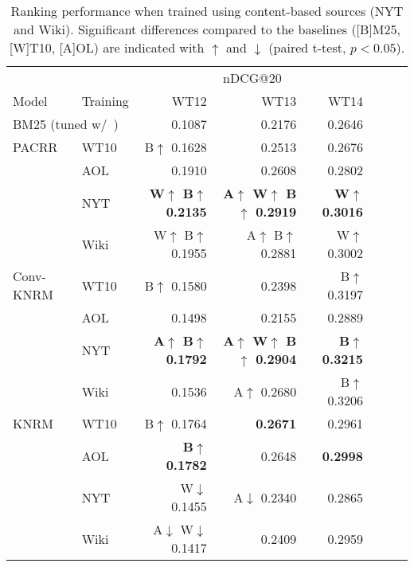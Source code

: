 \begin{table}
\scriptsize
\caption{Ranking performance when trained using content-based sources (NYT and Wiki). Significant differences compared to the baselines ([B]M25, [W]T10, [A]OL) are indicated with $\uparrow$ and $\downarrow$ (paired t-test, $p<0.05$).}\label{tab.results}
\vspace{-1em}
\begin{tabular}{llrrrrrr}
\toprule
&&\multicolumn{3}{c}{nDCG@20} \\\cmidrule(lr){3-5}
        Model &   Training & WT12 & WT13 & WT14 \\
\midrule


\multicolumn{2}{l}{BM25 (tuned w/~\cite{Yang2017AnseriniET})} & 0.1087  & 0.2176  & 0.2646 \\
\midrule
PACRR & WT10 & B$\uparrow$ 0.1628  & 0.2513  & 0.2676 \\
 & AOL & 0.1910  & 0.2608  & 0.2802 \\
\greyrule
 & NYT & \bf W$\uparrow$ B$\uparrow$ 0.2135  & \bf A$\uparrow$ W$\uparrow$ B$\uparrow$ 0.2919  & \bf W$\uparrow$ 0.3016 \\
 & Wiki & W$\uparrow$ B$\uparrow$ 0.1955  & A$\uparrow$ B$\uparrow$ 0.2881  & W$\uparrow$ 0.3002 \\
\midrule
Conv-KNRM & WT10 & B$\uparrow$ 0.1580  & 0.2398  & B$\uparrow$ 0.3197 \\
 & AOL & 0.1498  & 0.2155  & 0.2889 \\
\greyrule
 & NYT & \bf A$\uparrow$ B$\uparrow$ 0.1792  & \bf A$\uparrow$ W$\uparrow$ B$\uparrow$ 0.2904  & \bf B$\uparrow$ 0.3215 \\
 & Wiki & 0.1536  & A$\uparrow$ 0.2680  & B$\uparrow$ 0.3206 \\
\midrule
KNRM & WT10 & B$\uparrow$ 0.1764  & \bf 0.2671  & 0.2961 \\
 & AOL & \bf B$\uparrow$ 0.1782  & 0.2648  & \bf 0.2998 \\
\greyrule
 & NYT & W$\downarrow$ 0.1455  & A$\downarrow$ 0.2340  & 0.2865 \\
 & Wiki & A$\downarrow$ W$\downarrow$ 0.1417  & 0.2409  & 0.2959 \\


\bottomrule
\end{tabular}
\vspace{-2em}
\end{table}










\renewcommand{\arraystretch}{1}






